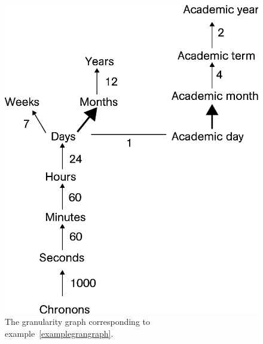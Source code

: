 

\begin{figure}
\centering
\includegraphics[scale=0.5]{graphs/granularityGraph.eps}
\caption{The granularity graph corresponding to example~\ref{examplegrangraph}.}
\label{fig:granularity-graph-example}
\end{figure}

\vspace{-25pt}

